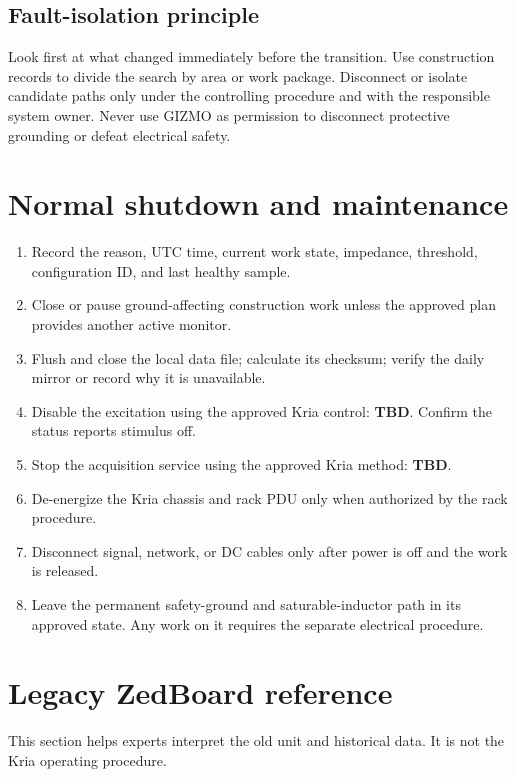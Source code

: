 \documentclass[11pt]{article}
\newcommand{\GIZMO}{\textsc{GIZMO}}
\newcommand{\TBD}{\textcolor{dunered}{\textbf{TBD}}}
\begin{document}
\subsection{Fault-isolation principle}

Look first at what changed immediately before the transition. Use construction records to divide the search by area or work package. Disconnect or isolate candidate paths only under the controlling procedure and with the responsible system owner. Never use \GIZMO{} as permission to disconnect protective grounding or defeat electrical safety.

\section{Normal shutdown and maintenance}

\begin{enumerate}
  \item Record the reason, UTC time, current work state, impedance, threshold, configuration ID, and last healthy sample.
  \item Close or pause ground-affecting construction work unless the approved plan provides another active monitor.
  \item Flush and close the local data file; calculate its checksum; verify the daily mirror or record why it is unavailable.
  \item Disable the excitation using the approved Kria control: \TBD. Confirm the status reports stimulus off.
  \item Stop the acquisition service using the approved Kria method: \TBD.
  \item De-energize the Kria chassis and rack PDU only when authorized by the rack procedure.
  \item Disconnect signal, network, or DC cables only after power is off and the work is released.
  \item Leave the permanent safety-ground and saturable-inductor path in its approved state. Any work on it requires the separate electrical procedure.
\end{enumerate}

\section{Legacy ZedBoard reference}

This section helps experts interpret the old unit and historical data. It is not the Kria operating procedure.
\end{document}
